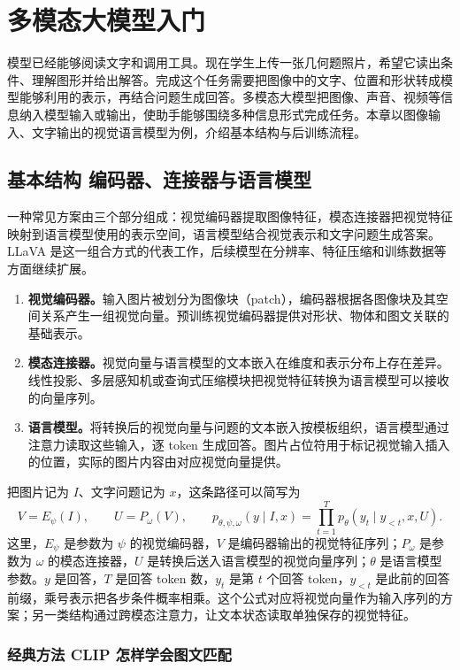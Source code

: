 \chapter{多模态大模型入门}\label{多模态大模型入门}

模型已经能够阅读文字和调用工具。现在学生上传一张几何题照片，希望它读出条件、理解图形并给出解答。完成这个任务需要把图像中的文字、位置和形状转成模型能够利用的表示，再结合问题生成回答。多模态大模型把图像、声音、视频等信息纳入模型输入或输出，使助手能够围绕多种信息形式完成任务。本章以图像输入、文字输出的视觉语言模型为例，介绍基本结构与后训练流程。

\section{基本结构 编码器、连接器与语言模型}

一种常见方案由三个部分组成：视觉编码器提取图像特征，模态连接器把视觉特征映射到语言模型使用的表示空间，语言模型结合视觉表示和文字问题生成答案。LLaVA 是这一组合方式的代表工作，后续模型在分辨率、特征压缩和训练数据等方面继续扩展。

\begin{enumerate}
    \item \textbf{视觉编码器。}输入图片被划分为图像块（patch），编码器根据各图像块及其空间关系产生一组视觉向量。预训练视觉编码器提供对形状、物体和图文关联的基础表示。
    \item \textbf{模态连接器。}视觉向量与语言模型的文本嵌入在维度和表示分布上存在差异。线性投影、多层感知机或查询式压缩模块把视觉特征转换为语言模型可以接收的向量序列。
    \item \textbf{语言模型。}将转换后的视觉向量与问题的文本嵌入按模板组织，语言模型通过注意力读取这些输入，逐 token 生成回答。图片占位符用于标记视觉输入插入的位置，实际的图片内容由对应视觉向量提供。
\end{enumerate}

把图片记为 $I$、文字问题记为 $x$，这条路径可以简写为
\[
V=E_{\psi}(I),\qquad U=P_{\omega}(V),\qquad
p_{\theta,\psi,\omega}(y\mid I,x)
=\prod_{t=1}^{T}p_{\theta}(y_t\mid y_{<t},x,U).
\]
这里，$E_{\psi}$ 是参数为 $\psi$ 的视觉编码器，$V$ 是编码器输出的视觉特征序列；$P_{\omega}$ 是参数为 $\omega$ 的模态连接器，$U$ 是转换后送入语言模型的视觉向量序列；$\theta$ 是语言模型参数。$y$ 是回答，$T$ 是回答 token 数，$y_t$ 是第 $t$ 个回答 token，$y_{<t}$ 是此前的回答前缀，乘号表示把各步条件概率相乘。这个公式对应将视觉向量作为输入序列的方案；另一类结构通过跨模态注意力，让文本状态读取单独保存的视觉特征。

\subsection{经典方法 CLIP 怎样学会图文匹配}

